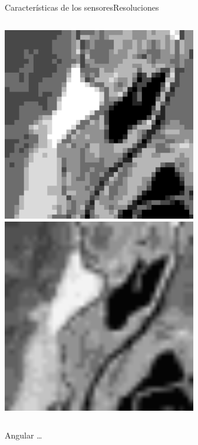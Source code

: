 \documentclass{beamer}
\begin{document}
\begin{frame}{Características de los sensores}{Resoluciones}
\begin{columns}[t]
\begin{itemize}
\begin{columns}
			\includegraphics[width=1\textwidth]{IMGs/res_rad3}
			\includegraphics[width=1\textwidth]{IMGs/res_rad4}
		\end{columns}	
		\end{itemize}
	\end{columns}
	Angular \ldots
\end{frame}
\end{document}
